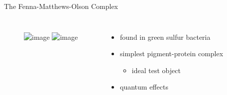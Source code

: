 \documentclass{beamer}
\begin{document}
\begin{frame}[label=FMO]{The Fenna-Matthews-Olson Complex}
  \begin{columns}
    \centering
    \vspace{-1cm}
    \begin{figure}
      \centering
      \includegraphics<1-1>[width=120pt]{fmo_full}
      \includegraphics<2->[width=120pt]{fmo_trimer}
    \end{figure}

    \begin{itemize}
      \item found in green sulfur bacteria
      \item simplest pigment-protein complex
      \begin{itemize}
        \item ideal test object
      \end{itemize}
      \item quantum effects
    \end{itemize}
  \end{columns}
  \vspace{-.5cm}
  \begin{columns}
    \centering
    \begin{figure}
      \centering
    \end{figure}


\end{columns}
\end{frame}
\end{document}
